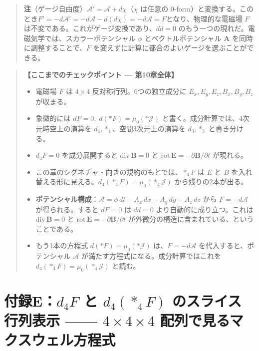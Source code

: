 \documentclass[a4paper,12pt,openany]{book}
\begin{document}
\begin{quote}
\textbf{注}（ゲージ自由度）\(\mathcal{A}'=\mathcal{A}+d\chi\)（\(\chi\)
は任意の
\(0\)-form）と変換する。このとき\(F'=-d\mathcal{A}'=-d\mathcal{A}-d(d\chi)=-d\mathcal{A}=F\)となり、物理的な電磁場
\(F\) は不変である。これがゲージ変換であり、\(dd=0\)
のもう一つの現れだ。電磁気学では、スカラーポテンシャル \(\phi\)
とベクトルポテンシャル \(\mathbf{A}\) を同時に調整することで、\(F\)
を変えずに計算に都合のよいゲージを選ぶことができる。
\end{quote}

\begin{quote}
\textbf{【ここまでのチェックポイント — 第10章全体】}

\begin{itemize}
\item
  電磁場 \(F\) は \(4\times4\) 反対称行列。6つの独立成分に
  \(E_x,E_y,E_z,B_x,B_y,B_z\) が収まる。
\item
  象徴的には \(dF=0,\;d(\ast F)=\mu_0(\ast\mathcal{J})\)
  と書く。成分計算では、4次元時空上の演算を
  \(d_4,\ast_4\)、空間3次元上の演算を \(d_3,\ast_3\) と書き分ける。
\item
  \(d_4F=0\) を成分展開すると \(\mathrm{div}\,\mathbf{B}=0\) と
  \(\mathrm{rot}\,\mathbf{E}=-\partial\mathbf{B}/\partial t\) が現れる。
\item
  この章のシグネチャ・向きの規約のもとでは、\(\ast_4F\) は \(E\) と
  \(B\)
  を入れ替える形に見える。\(d_4(\ast_4F)=\mu_0(\ast_4\mathcal{J})\)
  から残りの2本が出る。
\item
  \textbf{ポテンシャル構成}：\(\mathcal{A}=\phi\,dt-A_x\,dx-A_y\,dy-A_z\,dz\)
  から \(F=-d\mathcal{A}\) が得られる。すると \(dF=0\) は \(dd=0\)
  より自動的に成り立つ。これは \(\mathrm{div}\,\mathbf{B}=0\) と
  \(\mathrm{rot}\,\mathbf{E}=-\partial\mathbf{B}/\partial t\)
  が外微分の構造に含まれている、ということである。
\item
  もう1本の方程式 \(d(\ast F)=\mu_0(\ast\mathcal{J})\)
  は、\(F=-d\mathcal{A}\) を代入すると、ポテンシャル \(\mathcal{A}\)
  が満たす方程式になる。成分計算ではこれを
  \(d_4(\ast_4F)=\mu_0(\ast_4\mathcal{J})\) と読む。
\end{itemize}
\end{quote}

\par\vspace{0.35em}\par

\hypertarget{ux4ed8ux9332ed_4f-ux3068-d_4ast_4f-ux306eux30b9ux30e9ux30a4ux30b9ux884cux5217ux8868ux793a-4times4times4-ux914dux5217ux3067ux898bux308bux30deux30afux30b9ux30a6ux30a7ux30ebux65b9ux7a0bux5f0f}{%
\section{\texorpdfstring{付録E：\(d_4F\) と \(d_4(\ast_4F)\)
のスライス行列表示 —— \(4\times4\times4\)
配列で見るマクスウェル方程式}{付録E：d\_4F と d\_4(\textbackslash ast\_4F) のスライス行列表示 —— 4\textbackslash times4\textbackslash times4 配列で見るマクスウェル方程式}}\label{ux4ed8ux9332ed_4f-ux3068-d_4ast_4f-ux306eux30b9ux30e9ux30a4ux30b9ux884cux5217ux8868ux793a-4times4times4-ux914dux5217ux3067ux898bux308bux30deux30afux30b9ux30a6ux30a7ux30ebux65b9ux7a0bux5f0f}}
\end{document}
